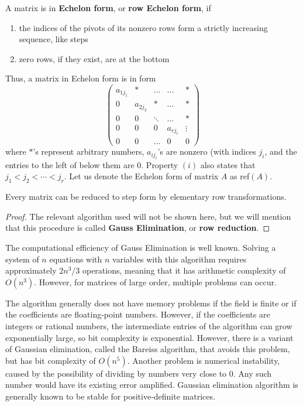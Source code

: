   \begin{definition}
    A matrix is in \textbf{Echelon form}, or \textbf{row Echelon form}, if 
    \begin{enumerate}
      \item the indices of the pivots of its nonzero rows form a strictly increasing sequence, like steps
      \item zero rows, if they exist, are at the bottom
    \end{enumerate}
    Thus, a matrix in Echelon form is in form
    \begin{equation}
      \begin{pmatrix}
        a_{1 j_1} & * & \ldots & \ldots & * \\
        0 & a_{2 j_2} & * & \ldots & * \\
        0& 0& \ddots & \ldots & * \\
        0& 0& 0& a_{r j_r} & \vdots \\
        0 & 0 & \ldots & 0 & 0
      \end{pmatrix}
    \end{equation}
    where $*$'s represent arbitrary numbers, $a_{i j_i}$'s are nonzero (with indices $j_i$, and the entries to the left of below them are $0$. Property $(i)$ also states that $j_1 < j_2 < \cdots < j_r$. Let us denote the Echelon form of matrix $A$ as ref$(A)$. 
  \end{definition}

  \begin{theorem}
    Every matrix can be reduced to step form by elementary row transformations. 
  \end{theorem}
  \begin{proof}
    The relevant algorithm used will not be shown here, but we will mention that this procedure is called \textbf{Gauss Elimination}, or \textbf{row reduction}. 
  \end{proof}

  The computational efficiency of Gauss Elimination is well known. Solving a system of $n$ equations with $n$ variables with this algorithm requires approximately $2 n^3 / 3$ operations, meaning that it has arithmetic complexity of $O(n^3)$. However, for matrices of large order, multiple problems can occur. 

  The algorithm generally does not have memory problems if the field is finite or if the coefficients are floating-point numbers. However, if the coefficients are integers or rational numbers, the intermediate entries of the algorithm can grow exponentially large, so bit complexity is exponential. However, there is a variant of Gaussian elimination, called the Bareiss algorithm, that avoids this problem, but has bit complexity of $O(n^5)$. Another problem is numerical instability, caused by the possibility of dividing by numbers very close to $0$. Any such number would have its existing error amplified. Gaussian elimination algorithm is generally known to be stable for positive-definite matrices. 

